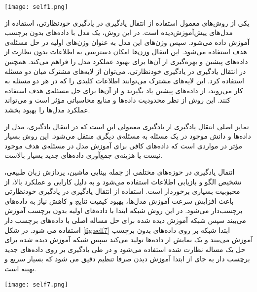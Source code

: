 \begin{minipage}{\linewidth}
	\centering
	\texttt{[image: self1.png]}
	\captionsetup{font=small} %
	\label{fig:self6}
\end{minipage}

یکی از روش‌های معمول استفاده از انتقال یادگیری در یادگیری خودنظارتی، استفاده از مدل‌های پیش‌آموزش‌دیده  است. در این روش، یک مدل با داده‌های بدون برچسب آموزش داده می‌شود. سپس وزن‌های این مدل به عنوان وزن‌های اولیه در حل مسئله‌ی هدف استفاده می‌شود. این انتقال وزن‌ها امکان دسترسی به اطلاعات بدون نظارت از داده‌های پیشین و بهره‌گیری از آن‌ها برای بهبود عملکرد مدل را فراهم می‌کند.
\citep{mao2020survey}
همچنین در انتقال یادگیری در یادگیری خودنظارتی، می‌توان از لایه‌های مشترک میان دو مسئله استفاده کرد. این لایه‌های مشترک می‌توانند اطلاعات کلیدی را که در هر دو مسئله به کار می‌روند، از داده‌های پیشین یاد بگیرند و از آن‌ها برای حل مسئله‌ی هدف استفاده کنند. این روش از نظر محدودیت داده‌ها و منابع محاسباتی مؤثر است و می‌تواند عملکرد مدل‌ها را بهبود بخشد.



تمایز اصلی انتقال یادگیری از یادگیری معمولی این است که در انتقال یادگیری، مدل از داده‌ها و دانش موجود در یک مسئله به مسئله‌ی دیگری منتقل می‌شود. این روش بسیار مؤثر در مواردی است که داده‌های کافی برای آموزش مدل در مسئله‌ی هدف موجود نیست یا هزینه‌ی جمع‌آوری داده‌های جدید بسیار بالاست.

انتقال یادگیری در حوزه‌های مختلفی از جمله بینایی ماشین، پردازش زبان طبیعی، تشخیص الگو و بازیابی اطلاعات استفاده می‌شود و به دلیل کارایی و عملکرد بالا، از محبوبیت بسیاری برخوردار است.
استفاده از انتقال یادگیری در یادگیری خودنظارتی باعث افزایش سرعت آموزش مدل‌ها، بهبود کیفیت نتایج و کاهش نیاز به داده‌های برچسب‌دار می‌شود. در این روش شبکه ابتدا با داده‌های اولیه بدون برچسب  آموزش می‌بیند سپس شبکه آموزش دیده شده برای حل مساله اصلی با داده‌های برچسب دار استفاده می شود. در شکل \ref{fig:self7} ابتدا شبکه بر روی داده‌های بدون برچسب آموزش می‌بیند و یک نمایش از داده‌ها تولید می‌کند سپس شبکه آموزش دیده شده برای حل یک مساله نظارت شده استفاده می‌شود و در طی یادگیری بر روی داده‌های جدید برچسب دار به  جای از ابتدا آموزش دیدن صرفا تنظیم دقیق می شود که بسیار سریع و بهینه است.
\citep{medina2020self}

\begin{minipage}{\linewidth}
	\centering
	\texttt{[image: self7.png]}
	\captionsetup{font=small} %
	\label{fig:self7}
\end{minipage}


